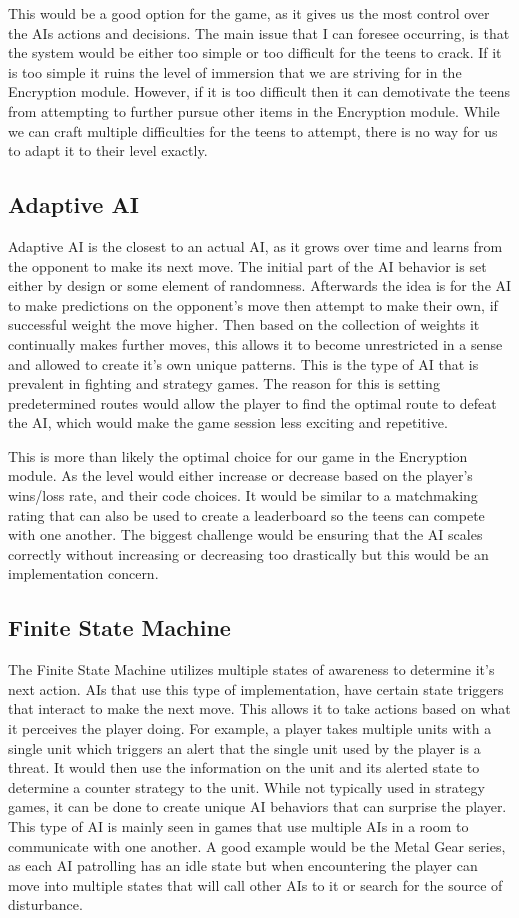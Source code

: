 \documentclass[onecolumn, draftclsnofoot,10pt, compsoc]{IEEEtran}
\begin{document}
This would be a good option for the game, as it gives us the most control over the AIs actions and decisions. The main issue that I can foresee occurring, is that the system would be either too simple or too difficult for the teens to crack. If it is too simple it ruins the level of immersion that we are striving for in the Encryption module. However, if it is too difficult then it can demotivate the teens from attempting to further pursue other items in the Encryption module. While we can craft multiple difficulties for the teens to attempt, there is no way for us to adapt it to their level exactly.
\subsection{Adaptive AI}
Adaptive AI is the closest to an actual AI, as it grows over time and learns from the opponent to make its next move. The initial part of the AI behavior is set either by design or some element of randomness. Afterwards the idea is for the AI to make predictions on the opponent's move then attempt to make their own, if successful weight the move higher. Then based on the collection of weights it continually makes further moves, this allows it to become unrestricted in a sense and allowed to create it's own unique patterns. This is the type of AI that is prevalent in fighting and strategy games. The reason for this is setting predetermined routes would allow the player to find the optimal route to defeat the AI, which would make the game session less exciting and repetitive.

This is more than likely the optimal choice for our game in the Encryption module. As the level would either increase or decrease based on the player's wins/loss rate, and their code choices. It would be similar to a matchmaking rating that can also be used to create a leaderboard so the teens can compete with one another. The biggest challenge would be ensuring that the AI scales correctly without increasing or decreasing too drastically but this would be an implementation concern.

\subsection{Finite State Machine}
The Finite State Machine utilizes multiple states of awareness to determine it's next action. AIs that use this type of implementation, have certain state triggers that interact to make the next move. This allows it to take actions based on what it perceives the player doing. For example, a player takes multiple units with a single unit which triggers an alert that the single unit used by the player is a threat. It would then use the information on the unit and its alerted state to determine a counter strategy to the unit. While not typically used in strategy games, it can be done to create unique AI behaviors that can surprise the player. This type of AI is mainly seen in games that use multiple AIs in a room to communicate with one another. A good example would be the Metal Gear series, as each AI patrolling has an idle state but when encountering the player can move into multiple states that will call other AIs to it or search for the source of disturbance.
\end{document}
